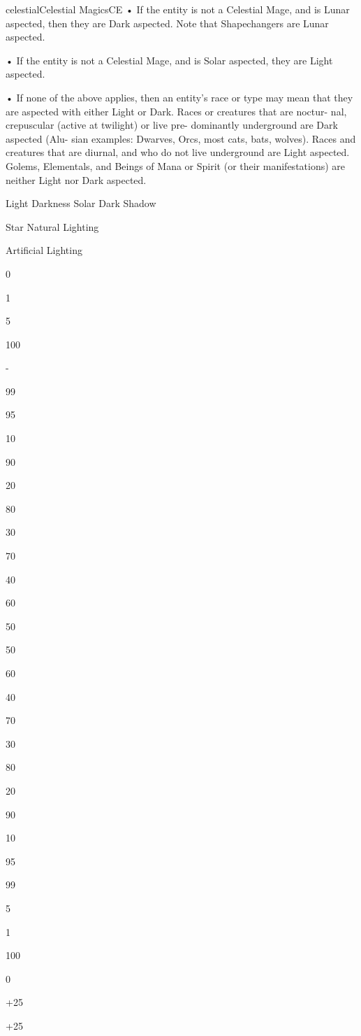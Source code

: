 \begin{College}[1.3]{celestial}{Celestial Magics}{CE}
• If the entity is not a Celestial Mage, and is Lunar 
aspected,  then  they  are  Dark  aspected.  Note  that 
Shapechangers are Lunar aspected.  

• If the entity is not a Celestial Mage, and is Solar 
aspected, they are Light aspected.  

• If none of the above applies, then an entity’s race 
or type may mean that they are aspected with either 
Light  or  Dark.  Races  or  creatures  that  are  noctur-
nal,  crepuscular  (active  at  twilight)  or  live  pre-
dominantly  underground  are  Dark  aspected  (Alu-
sian  examples:  Dwarves,  Orcs,  most  cats,  bats, 
wolves).  Races  and  creatures  that  are  diurnal,  and 
who  do  not  live  underground  are  Light  aspected. 
Golems, Elementals, and Beings of Mana or Spirit 
(or their manifestations) are neither Light nor Dark 
aspected. 

Light  Darkness  Solar  Dark  Shadow 

Star  Natural Lighting 

Artificial Lighting 

0%

1%

5%

100%

- 

99%

95%

10%

90%

20%

80%

30%

70%

40%

60%

50%

50%

60%

40%

70%

30%

80%

20%

90%

10%

95%

99%

5%

1%

100%

0%

+25 

+25 


\end{College}
